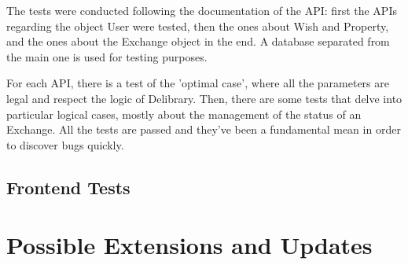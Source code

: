 The tests were conducted following the documentation of the API: first the APIs regarding the object User were tested, then the ones about Wish and Property, and the ones about the Exchange object in the end.
A database separated from the main one is used for testing purposes.

For each API, there is a test of the 'optimal case', where all the parameters are legal and respect the logic of Delibrary.
Then, there are some tests that delve into particular logical cases, mostly about the management of the status of an Exchange.
All the tests are passed and they've been a fundamental mean in order to discover bugs quickly.

\section{Frontend Tests}



\chapter{Possible Extensions and Updates}



